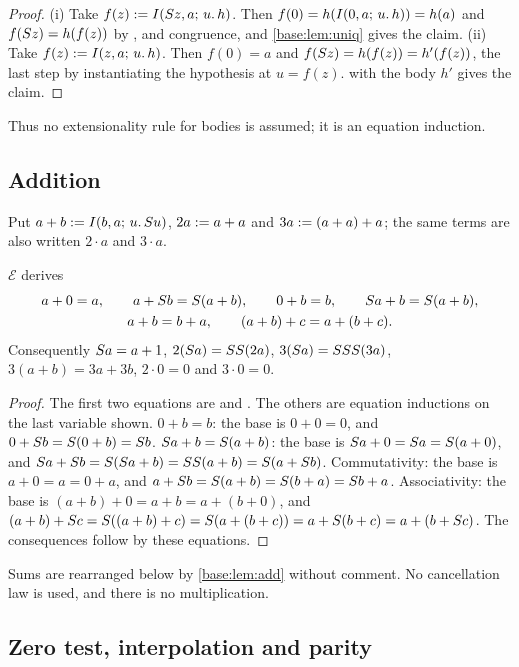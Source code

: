 \begin{proof}
(i) Take $f(z)\mathrel{:=}I(S z,a;\,u.\,h)$.  Then
$f(0)=h(I(0,a;\,u.\,h))=h(a)$ and $f(S z)=h(f(z))$ by ,
 and congruence, and \cref{base:lem:uniq} gives the claim.
(ii) Take $f(z)\mathrel{:=}I(z,a;\,u.\,h)$.  Then $f(0)=a$ and
$f(S z)=h(f(z))=h'(f(z))$, the last step by instantiating the hypothesis
at $u=f(z)$.   with the body $h'$ gives the claim.
\end{proof}

Thus no extensionality rule for bodies is assumed; it is an equation
induction.

\subsection{Addition}

Put $a+b\mathrel{:=}I(b,a;\,u.\,S u)$, $2a\mathrel{:=} a+a$ and
$3a\mathrel{:=}(a+a)+a$; the same terms are also written $2\cdot a$ and
$3\cdot a$.

\begin{lemma}[Addition]
\label{base:lem:add}
$\mathcal E$ derives
\begin{gather*}
 a+0=a,\qquad a+S b=S(a+b),\qquad 0+b=b,\qquad S a+b=S(a+b),\\
 a+b=b+a,\qquad (a+b)+c=a+(b+c).
\end{gather*}
Consequently $S a=a+1$, $2(S a)=SS(2a)$,
$3(S a)=SSS(3a)$, $3(a+b)=3a+3b$, $2\cdot 0=0$ and $3\cdot 0=0$.
\end{lemma}

\begin{proof}
The first two equations are  and .  The others
are equation inductions on the last variable shown.
$0+b=b$: the base is $0+0=0$, and $0+S b=S(0+b)=S b$.
$S a+b=S(a+b)$: the base is $S a+0=S a=S(a+0)$, and
$S a+S b=S(S a+b)=SS(a+b)=S(a+S b)$.
Commutativity: the base is $a+0=a=0+a$, and
$a+S b=S(a+b)=S(b+a)=S b+a$.
Associativity: the base is $(a+b)+0=a+b=a+(b+0)$, and
$(a+b)+S c=S((a+b)+c)=S(a+(b+c))=a+S(b+c)=a+(b+S c)$.
The consequences follow by these equations.
\end{proof}

Sums are rearranged below by \cref{base:lem:add} without comment.  No
cancellation law is used, and there is no multiplication.

\subsection{Zero test, interpolation and parity}

